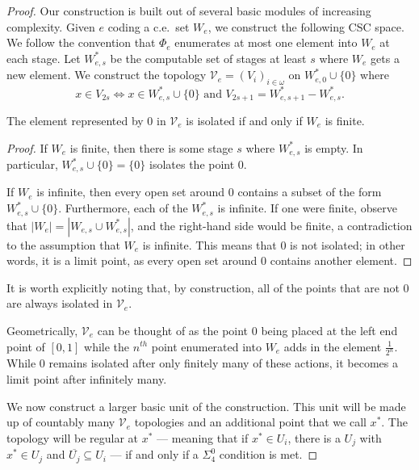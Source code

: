\documentclass[11pt]{amsart}
\theoremstyle{remark}
\begin{document}
\begin{proof}
    Our construction is built out of several basic modules of increasing complexity.
    Given $e$ coding a c.e.\ set $W_e$, we construct the following CSC space.
    We follow the convention that $\Phi_e$ enumerates at most one element into $W_e$ at each stage.
    Let $W_{e,s}^*$ be the computable set of stages at least $s$ where $W_e$ gets a new element.
    We construct the topology $\mathcal{V}_e=(V_i)_{i\in\omega}$ on $W_{e,0}^*\cup\{0\}$ where
    \[x\in V_{2s} \iff x\in W_{e,s}^*\cup\{0\} \text{   and   } V_{2s+1}=W_{e,s+1}^*-W_{e,s}^*.\]

    \begin{claim}\label{claim:basicUnit}
        The element represented by $0$ in $\mathcal{V}_e$ is isolated if and only if $W_e$ is finite.
    \end{claim}

    \begin{proof}
    If $W_e$ is finite, then there is some stage $s$ where $W_{e,s}^*$ is empty.
    In particular, $W_{e,s}^*\cup\{0\}=\{0\}$ isolates the point $0$.

    If $W_e$ is infinite, then every open set around $0$ contains a subset of the form $W_{e,s}^*\cup\{0\}$.
    Furthermore, each of the $W_{e,s}^*$ is infinite.
    If one were finite, observe that $|W_e|=|W_{e,s}\cup W^*_{e,s}|$, and the right-hand side would be finite, a contradiction to the assumption that $W_e$ is infinite.
    This means that $0$ is not isolated; in other words, it is a limit point, as every open set around $0$ contains another element.
    \end{proof}

    It is worth explicitly noting that, by construction, all of the points that are not $0$ are always isolated in $\mathcal{V}_e$.

    Geometrically, $\mathcal{V}_e$ can be thought of as the point $0$ being placed at the left end point of $[0,1]$ while the $n^{th}$ point enumerated into $W_e$ adds in the element $\frac{1}{2^n}$.
    While $0$ remains isolated after only finitely many of these actions, it becomes a limit point after infinitely many.

    We now construct a larger basic unit of the construction.
    This unit will be made up of countably many $\mathcal{V}_e$ topologies and an additional point that we call $x^*$.
    The topology will be regular at $x^*$ ---  meaning that if $x^*\in U_i$, there is a $U_j$ with $x^*\in U_j$ and $\overline{U_j}\subseteq U_i$ --- if and only if a $\Sigma_4^0$ condition is met.


\end{proof}
\end{document}
